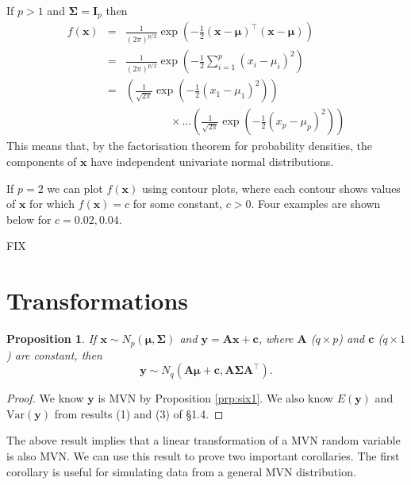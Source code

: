 \documentclass[]{book}
\newtheorem{proposition}{Proposition}[chapter]
\theoremstyle{definition}
\theoremstyle{definition}
\theoremstyle{definition}
\theoremstyle{remark}
\begin{document}
If \(p>1\) and \(\boldsymbol \Sigma= \boldsymbol I_p\) then
\begin{eqnarray*}
f(\boldsymbol x) &=& \frac{1}{(2 \pi)^{p/2}} \exp \left(-\frac{1}{2}(\boldsymbol x- \boldsymbol \mu)^\top (\boldsymbol x- \boldsymbol \mu) \right)\\
&=& \frac{1}{(2 \pi)^{p/2}} \exp \left(-\frac{1}{2} \sum_{i=1}^p (x_i - \mu_i)^2 \right)\\
&=& \left(\frac{1}{\sqrt{2 \pi}} \exp \left(-\frac{1}{2} (x_1 - \mu_1)^2 \right)\right)\\
 && \qquad \qquad \times \ldots \left(\frac{1}{\sqrt{2 \pi}} \exp \left(-\frac{1}{2} (x_p - \mu_p)^2 \right)\right)
\end{eqnarray*}
This means that, by the factorisation theorem for probability densities, the components of \(\boldsymbol x\) have independent univariate normal distributions.

If \(p=2\) we can plot \(f(\boldsymbol x)\) using contour plots, where each contour shows values of \(\boldsymbol x\) for which \(f(\boldsymbol x) = c\) for some constant, \(c > 0\). Four examples are shown below for \(c = 0.02, 0.04\).

FIX

\hypertarget{transformations}{%
\section{Transformations}\label{transformations}}

\begin{proposition}
\protect\hypertarget{prp:six2}{}{\label{prp:six2} } If \(\boldsymbol x\sim N_p(\boldsymbol \mu,\boldsymbol \Sigma)\) and \(\boldsymbol y= \boldsymbol A\boldsymbol x+ \boldsymbol c\), where \(\boldsymbol A\) (\(q \times p\)) and \(\boldsymbol c\) (\(q \times 1\)) are constant, then
\[\boldsymbol y\sim N_q(\boldsymbol A\boldsymbol \mu+ \boldsymbol c, \boldsymbol A\boldsymbol \Sigma\boldsymbol A^\top).\]
\end{proposition}

\begin{proof}
{}We know \(\boldsymbol y\) is MVN by Proposition \ref{prp:six1}. We also know \(E(\boldsymbol y)\) and \(\text{Var}(\boldsymbol y)\) from results (1) and (3) of \S 1.4.
\end{proof}

The above result implies that a linear transformation of a MVN random variable is also MVN. We can use this result to prove two important corollaries. The first corollary is useful for simulating data from a general MVN distribution.
\end{document}
